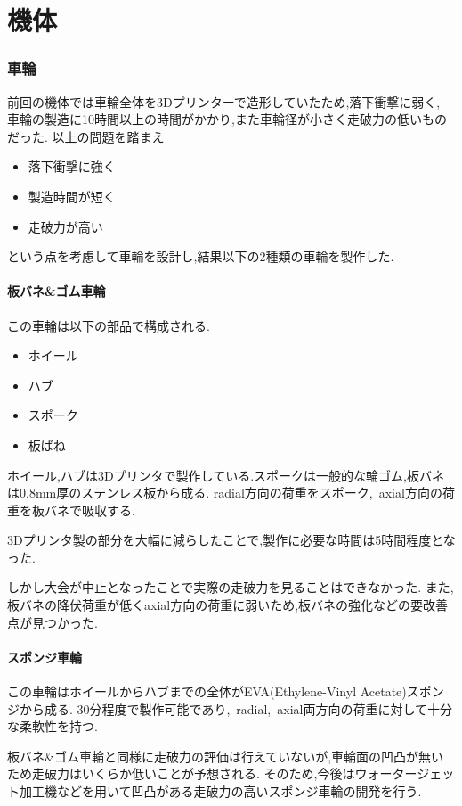 \part*{機体}
\section{車輪}
前回の機体では車輪全体を3Dプリンターで造形していたため,落下衝撃に弱く,
車輪の製造に10時間以上の時間がかかり,また車輪径が小さく走破力の低いものだった.
以上の問題を踏まえ
\begin{itemize}
  \item 落下衝撃に強く
  \item 製造時間が短く
  \item 走破力が高い
\end{itemize}
という点を考慮して車輪を設計し,結果以下の2種類の車輪を製作した.
\vfill\null
\columnbreak
\subsection{板バネ\&ゴム車輪}
この車輪は以下の部品で構成される.
\begin{itemize}
  \item ホイール
  \item ハブ
  \item スポーク
  \item 板ばね
\end{itemize}
ホイール,ハブは3Dプリンタで製作している.スポークは一般的な輪ゴム,板バネは0.8mm厚のステンレス板から成る.
radial方向の荷重をスポーク,\ axial方向の荷重を板バネで吸収する.

3Dプリンタ製の部分を大幅に減らしたことで,製作に必要な時間は5時間程度となった.

しかし大会が中止となったことで実際の走破力を見ることはできなかった.
また,板バネの降伏荷重が低くaxial方向の荷重に弱いため,板バネの強化などの要改善点が見つかった.
\vfill\null
\columnbreak
{}
\subsection{スポンジ車輪}
この車輪はホイールからハブまでの全体がEVA(Ethylene-Vinyl Acetate)スポンジから成る.
30分程度で製作可能であり,\ radial,\ axial両方向の荷重に対して十分な柔軟性を持つ.

板バネ\&ゴム車輪と同様に走破力の評価は行えていないが,車輪面の凹凸が無いため走破力はいくらか低いことが予想される.
そのため,今後はウォータージェット加工機などを用いて凹凸がある走破力の高いスポンジ車輪の開発を行う.
\vfill\null
\columnbreak
